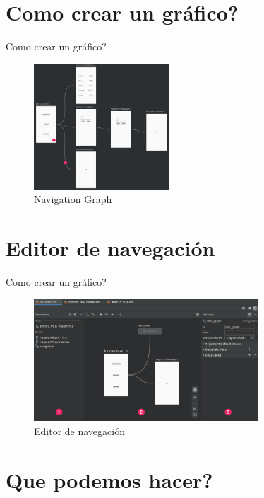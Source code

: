 \documentclass[10pt,xcolor={table,dvipsnames},t]{beamer}
\begin{document}
\section{Como crear un gráfico?}

\begin{frame}{Como crear un gráfico?}

\begin{figure}
\includegraphics[width=0.45\textwidth]{navigation_graph.png}
\caption{\label{fig:nav_graph} Navigation Graph}
\end{figure}

\end{frame}

\section{Editor de navegación}

\begin{frame}{Como crear un gráfico?}

\begin{figure}
\includegraphics[width=0.75\textwidth]{nav-editor.png}
\caption{\label{fig:nav_graph} Editor de navegación}
\end{figure}

\end{frame}

\section{Que podemos hacer?}
\end{document}
